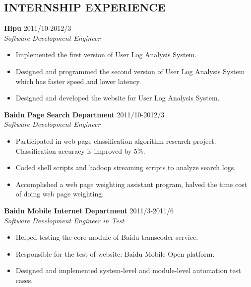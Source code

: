 \documentclass[a4paper]{res}
\begin{document}
\begin{resume}

\section{INTERNSHIP EXPERIENCE}{
    \vspace{-0.05in}
    \hspace{-0.5in}{\rule{17.5cm}{0.02cm}}
	\textbf{\normalsize {Hipu}} \hfill 2011/10-2012/3 \\
	\textit{Software Development Engineer }\\
	\vspace{-0.13in}
	\begin{itemize} \itemsep -2pt  %
		\item Implemented the first version of User Log Analysis System.
		\item Designed and programmed the second version of User Log Analysis System which has faster speed and lower latency.
		\item Designed and developed the website for User Log Analysis System.
 	\end{itemize}
    \vspace{-0.09in}

	\textbf{\normalsize {Baidu Page Search Department}} \hfill 2011/10-2012/3 \\
	\textit{Software Development Engineer}\\
	\vspace{-0.13in}
	\begin{itemize} \itemsep -2pt  %
		\item Participated in web page classification algorithm research project. Classification accuracy is improved by 5\%.
		\item Coded shell scripts and hadoop streaming scripts to analyze search logs.
		\item Accomplished a web page weighting assistant program, halved the time cost of doing web page weighting.
 	\end{itemize}
    \vspace{-0.09in}

 	\textbf{\normalsize {Baidu Mobile Internet Department}} \hfill 2011/3-2011/6 \\
	\textit{Software Development Engineer in Test}\\
	\vspace{-0.13in}
	\begin{itemize} \itemsep -2pt  %
		\item Helped testing the core module of Baidu transcoder service.
		\item Responsible for the test of website: Baidu Mobile Open platform.
		\item Designed and implemented system-level and module-level automation test cases.
 	\end{itemize}
}


\end{resume}
\end{document}
